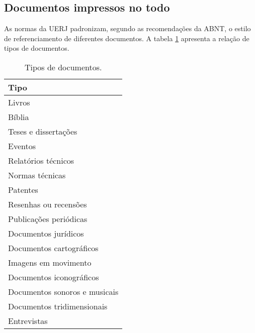 \documentclass[a4paper,12pt,oneside,onecolumn]{article}
\begin{document}


\subsection{Documentos impressos no todo}

As normas da UERJ padronizam, segundo as recomendações da ABNT, o estilo de referenciamento de diferentes documentos. A tabela \ref{tab:tabela1} apresenta a relação de tipos de documentos.

\begin{table}[!ht]
  \caption{Tipos de documentos.}
  \center
  \begin{tabular}{l}
    \hline
    Tipo \\
    \hline
    Livros \\
    Bíblia \\
    Teses e dissertações \\
    Eventos \\
    Relatórios técnicos \\
    Normas técnicas \\
    Patentes \\
    Resenhas ou recensões \\
    Publicações periódicas \\
    Documentos jurídicos \\
    Documentos cartográficos \\
    Imagens em movimento \\
    Documentos iconográficos \\
    Documentos sonoros e musicais \\
    Documentos tridimensionais \\
    Entrevistas \\
    \hline
  \end{tabular}
  \label{tab:tabela1}
\end{table}
\end{document}
